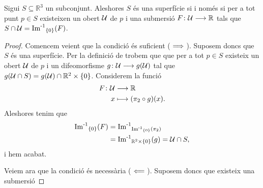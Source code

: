 \documentclass[../Apunts.tex]{subfiles}
\begin{document}
	\begin{theorem}
		\label{thm:condicions equivalents a la definició de superfície}
		Sigui \(S\subseteq\mathbb{R}^{3}\) un subconjunt. Aleshores \(S\) és una superfície si i només si per a tot punt \(p\in S\) existeixen un obert \(\mathcal{U}\) de \(p\) i una submersió \(F\colon\mathcal{U}\longrightarrow\mathbb{R}\) tals que \(S\cap\mathcal{U}=\operatorname{\operatorname{Im}^{-1}}_{\{0\}}(F)\).
		\begin{proof}
			Comencem veient que la condició és suficient (\(\implies\)). Suposem doncs que \(S\) és una superfície. Per la definició de  trobem que que per a tot \(p\in S\) existeix un obert \(\mathcal{U}\) de \(p\) i un difeomorfisme \(g\colon\mathcal{U}\longrightarrow g(\mathcal{U})\) tal que \(g(\mathcal{U}\cap S)=g(\mathcal{U})\cap\mathbb{R}^{2}\times\{0\}\). Considerem la funció
			\begin{align*}
				F\colon\mathcal{U}&\longrightarrow\mathbb{R} \\
				x&\longmapsto(\pi_{2}\circ g)(x).
			\end{align*}
			Aleshores tenim que
			\begin{align*}
				\operatorname{\operatorname{Im}^{-1}}_{\{0\}}(F)&=\operatorname{\operatorname{Im}^{-1}}_{\operatorname{\operatorname{Im}^{-1}}_{\{0\}}(\pi_{2})} \\
				&=\operatorname{\operatorname{Im}^{-1}}_{\mathbb{R}^{2}\times\{0\}}(g)=\mathcal{U}\cap S,
			\end{align*}
			i hem acabat.
			
			Veiem ara que la condició és necessària (\(\impliedby\)). Suposem doncs que existeix una submersió 
		\end{proof}
	\end{theorem}
\end{document}
